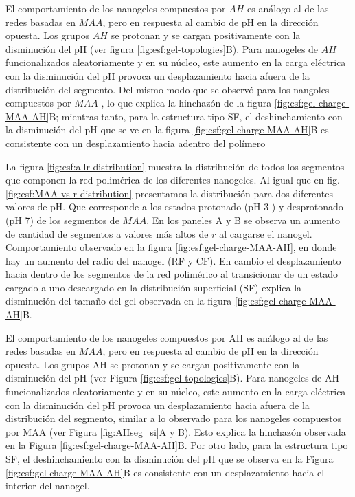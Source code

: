 El comportamiento de los nanogeles compuestos por $AH$ es an\'alogo al de las redes basadas en $MAA$, pero en respuesta al cambio de pH en la direcci\'on opuesta.
Los grupos $AH$ se protonan y se cargan positivamente con la disminuci\'on del pH (ver figura \ref{fig:esf:gel-topologies}B).
Para nanogeles de $AH$ funcionalizados aleatoriamente y en su n\'ucleo, este aumento en la carga el\'ectrica con la disminuci\'on del pH provoca un desplazamiento hacia afuera de la distribuci\'on del segmento. Del mismo modo que se observ\'o para los nangoles compuestos por $MAA$%
, lo que explica la hinchaz\'on de la figura \ref{fig:esf:gel-charge-MAA-AH}B;
mientras tanto, para la estructura tipo SF, el deshinchamiento con la disminuci\'on del pH que se ve en la figura \ref{fig:esf:gel-charge-MAA-AH}B es consistente con un desplazamiento hacia adentro del pol\'imero %


La figura \ref{fig:esf:allr-distribution} muestra la distribuci\'on de todos los segmentos que componen la red polim\'erica de los diferentes nanogeles. 
Al igual que en fig. \ref{fig:esf:MAA-vs-r-distribution} presentamos la distribuci\'on para dos diferentes valores de pH. Que corresponde a los estados protonado (pH 3 ) y desprotonado (pH 7) de los segmentos de $MAA$.  En los paneles A y B se observa un aumento de cantidad de segmentos a valores m\'as altos de $r$ al cargarse el nanogel. Comportamiento observado en la figura \ref{fig:esf:gel-charge-MAA-AH}, en donde hay un aumento del radio del nanogel (RF y CF).
En cambio el desplazamiento hacia dentro de los segmentos de la red polim\'erico al transicionar de un estado cargado a uno descargado en la distribuci\'on superficial (SF) explica la disminuci\'on del tama\~no del gel observada en la figura \ref{fig:esf:gel-charge-MAA-AH}B.

El comportamiento de los nanogeles compuestos por AH es an\'alogo al de las redes basadas en $MAA$, pero en respuesta al cambio de pH en la direcci\'on opuesta. Los grupos AH se protonan y se cargan positivamente con la disminuci\'on del pH (ver Figura \ref{fig:esf:gel-topologies}B). Para nanogeles de AH funcionalizados aleatoriamente y en su n\'ucleo, este aumento en la carga el\'ectrica con la disminuci\'on del pH provoca un desplazamiento hacia afuera de la distribuci\'on del segmento, similar a lo observado para los nanogeles compuestos por MAA (ver Figura \ref{fig:AHseg_si}A y B). Esto explica la hinchaz\'on observada en la Figura \ref{fig:esf:gel-charge-MAA-AH}B. Por otro lado, para la estructura tipo SF, el deshinchamiento con la disminuci\'on del pH que se observa en la Figura \ref{fig:esf:gel-charge-MAA-AH}B es consistente con un desplazamiento hacia el interior del nanogel.%

